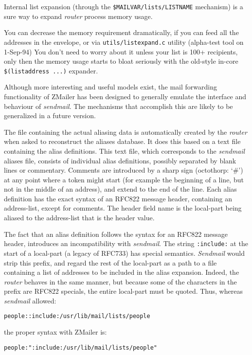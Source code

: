Internal list expansion (through the  {\tt \$MAILVAR/lists/LISTNAME} 
mechanism) is a sure way to expand {\em router} process memory usage.

You can decrease the memory requirement dramatically, if you can
feed all the addresses in the envelope, or via {\tt utils/listexpand.c}
utility (alpha-test tool on 1-Sep-94) You don't need to worry about 
it unless your list is 100+ recipients, only then the memory usage starts 
to bloat seriously with the old-style in-core {\tt \$(listaddress ...)} 
expander.

Although more interesting and useful models exist, the mail forwarding
functionality of ZMailer has been designed to generally emulate the
interface and behaviour of {\em sendmail}.  The mechanisms that accomplish this
are likely to be generalized in a future version.

The file containing the actual aliasing data is automatically created by
the {\em router} when asked to reconstruct the aliases database.  It does this
based on a text file containing the alias definitions.  This text file,
which corresponds to the {\em sendmail} aliases file, consists of individual
alias definitions, possibly separated by blank lines or commentary.
Comments are introduced by a sharp sign (octothorp: `\#') at any point where
a token might start (for example the beginning of a line, but not in the
middle of an address), and extend to the end of the line.  Each alias
definition has the exact syntax of an RFC822 message header, containing an
address-list, except for comments.  The header field name is the local-part
being aliased to the address-list that is the header value.

The fact that an alias definition follows the syntax for an RFC822 message
header, introduces an incompatibility with {\em sendmail}.  The string
{\tt :include:} at the start of a local-part (a legacy of RFC733) has special
semantics. {\em Sendmail} would strip this prefix, and regard the rest of the
local-part as a path to a file containing a list of addresses to be
included in the alias expansion. Indeed, the {\em router} behaves in the same
manner, but because some of the characters in the prefix are RFC822
specials, the entire local-part must be quoted.  Thus, whereas {\em sendmail}
allowed:

\begin{alltt}
 people: :include:/usr/lib/mail/lists/people
\end{alltt}

the proper syntax with ZMailer is:
\begin{alltt}
 people: ":include:/usr/lib/mail/lists/people"
\end{alltt}


